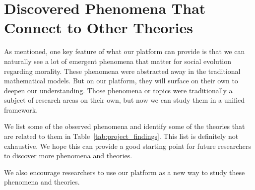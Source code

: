 \section{Discovered Phenomena That Connect to Other Theories}
As mentioned, one key feature of what our platform can provide is that we can naturally see a lot of emergent phenomena that matter for social evolution regarding morality. These phenomena were abstracted away in the traditional mathematical models. But on our platform, they will surface on their own to deepen our understanding. Those phenomena or topics were traditionally a subject of research areas on their own, but now we can study them in a unified framework. 

We list some of the observed phenomena and identify some of the theories that are related to them in Table~\ref{tab:project_findings}. This list is definitely not exhaustive. We hope this can provide a good starting point for future researchers to discover more phenomena and theories.

We also encourage researchers to use our platform as a new way to study these phenomena and theories.

